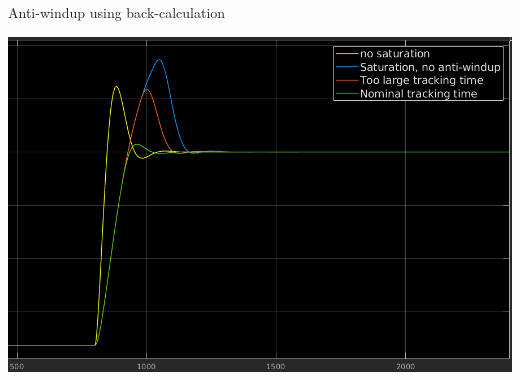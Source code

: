 \documentclass[presentation,aspectratio=169, usenames, dvipsnames]{beamer}
\begin{document}
\begin{frame}[label={sec:orgede0024}]{Anti-windup using back-calculation}
\begin{center}
\includegraphics[width=.82\linewidth]{../../figures/antiwindup-review.png}
\end{center}
\end{frame}
\end{document}
